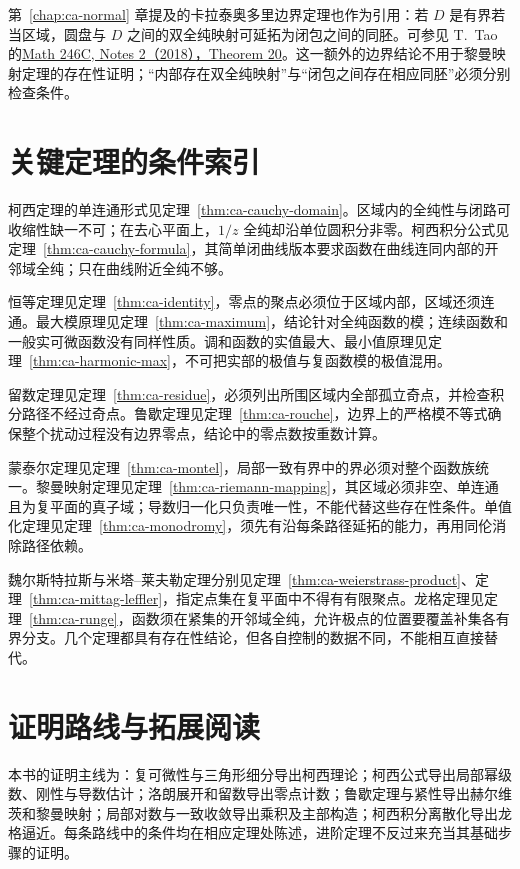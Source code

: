 第~\ref{chap:ca-normal} 章提及的卡拉泰奥多里边界定理也作为引用：若 $D$ 是有界若当区域，圆盘与 $D$ 之间的双全纯映射可延拓为闭包之间的同胚。可参见 T.~Tao 的\href{https://terrytao.wordpress.com/2018/04/12/246c-notes-2-circle-packings-conformal-maps-and-quasiconformal-maps/}{Math 246C, Notes 2（2018），Theorem 20}。这一额外的边界结论不用于黎曼映射定理的存在性证明；“内部存在双全纯映射”与“闭包之间存在相应同胚”必须分别检查条件。

\section{关键定理的条件索引}

柯西定理的单连通形式见定理~\ref{thm:ca-cauchy-domain}。区域内的全纯性与闭路可收缩性缺一不可；在去心平面上，$1/z$ 全纯却沿单位圆积分非零。柯西积分公式见定理~\ref{thm:ca-cauchy-formula}，其简单闭曲线版本要求函数在曲线连同内部的开邻域全纯；只在曲线附近全纯不够。

恒等定理见定理~\ref{thm:ca-identity}，零点的聚点必须位于区域内部，区域还须连通。最大模原理见定理~\ref{thm:ca-maximum}，结论针对全纯函数的模；连续函数和一般实可微函数没有同样性质。调和函数的实值最大、最小值原理见定理~\ref{thm:ca-harmonic-max}，不可把实部的极值与复函数模的极值混用。

留数定理见定理~\ref{thm:ca-residue}，必须列出所围区域内全部孤立奇点，并检查积分路径不经过奇点。鲁歇定理见定理~\ref{thm:ca-rouche}，边界上的严格模不等式确保整个扰动过程没有边界零点，结论中的零点数按重数计算。

蒙泰尔定理见定理~\ref{thm:ca-montel}，局部一致有界中的界必须对整个函数族统一。黎曼映射定理见定理~\ref{thm:ca-riemann-mapping}，其区域必须非空、单连通且为复平面的真子域；导数归一化只负责唯一性，不能代替这些存在性条件。单值化定理见定理~\ref{thm:ca-monodromy}，须先有沿每条路径延拓的能力，再用同伦消除路径依赖。

魏尔斯特拉斯与米塔--莱夫勒定理分别见定理~\ref{thm:ca-weierstrass-product}、定理~\ref{thm:ca-mittag-leffler}，指定点集在复平面中不得有有限聚点。龙格定理见定理~\ref{thm:ca-runge}，函数须在紧集的开邻域全纯，允许极点的位置要覆盖补集各有界分支。几个定理都具有存在性结论，但各自控制的数据不同，不能相互直接替代。

\section{证明路线与拓展阅读}

本书的证明主线为：复可微性与三角形细分导出柯西理论；柯西公式导出局部幂级数、刚性与导数估计；洛朗展开和留数导出零点计数；鲁歇定理与紧性导出赫尔维茨和黎曼映射；局部对数与一致收敛导出乘积及主部构造；柯西积分离散化导出龙格逼近。每条路线中的条件均在相应定理处陈述，进阶定理不反过来充当其基础步骤的证明。

